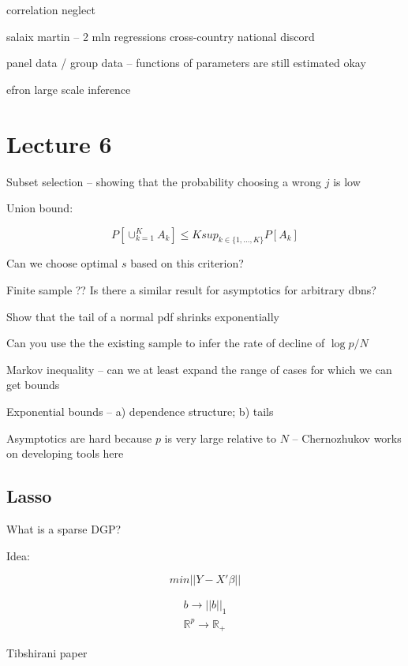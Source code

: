 \documentclass[a4paper,12pt,twoside]{article}
\begin{document}
correlation neglect

salaix martin -- 2 mln regressions cross-country
national discord

panel data / group data -- functions of parameters are still estimated okay

efron large scale inference


\section*{Lecture 6}

Subset selection -- showing that the probability choosing a wrong $j$ is low

Union bound:

\begin{equation}
	P\left[\cup_{k = 1}^K A_k \right] \leq K sup_{k \in \{1, \dots, K \}} P \left[ A_k \right]
\end{equation}

Can we choose optimal $s$ based on this criterion?

Finite sample ?? Is there a similar result for asymptotics for arbitrary dbns?

Show that the tail of a normal pdf shrinks exponentially

Can you use the the existing sample to infer the rate of decline of $\log p /N$

Markov inequality -- can we at least expand the range of cases for which we can get bounds

Exponential bounds -- a) dependence structure; b) tails


Asymptotics are hard because $p$ is very large relative to $N$ -- Chernozhukov works on developing tools here


\subsection*{Lasso}


What is a sparse DGP?

Idea:

\begin{equation}
	min ||Y - X' \beta ||
\end{equation}

\begin{align*}
	b \rightarrow ||b||_1 \\
	\mathbb{R}^p \rightarrow \mathbb{R}_+
\end{align*}

Tibshirani paper
\end{document}
